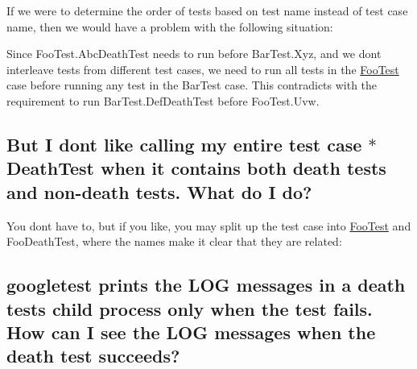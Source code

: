 If we were to determine the order of tests based on test name instead of test case name, then we would have a problem with the following situation\+:


\begin{DoxyCode}{0}
\DoxyCodeLine{}
\end{DoxyCode}


Since {\ttfamily Foo\+Test.\+Abc\+Death\+Test} needs to run before {\ttfamily Bar\+Test.\+Xyz}, and we don\textquotesingle{}t interleave tests from different test cases, we need to run all tests in the {\ttfamily \mbox{\hyperlink{classFooTest}{Foo\+Test}}} case before running any test in the {\ttfamily Bar\+Test} case. This contradicts with the requirement to run {\ttfamily Bar\+Test.\+Def\+Death\+Test} before {\ttfamily Foo\+Test.\+Uvw}.

\subsection*{But I don\textquotesingle{}t like calling my entire test case $\ast$\+Death\+Test when it contains both death tests and non-\/death tests. What do I do?}

You don\textquotesingle{}t have to, but if you like, you may split up the test case into {\ttfamily \mbox{\hyperlink{classFooTest}{Foo\+Test}}} and {\ttfamily Foo\+Death\+Test}, where the names make it clear that they are related\+:


\begin{DoxyCode}{0}
\DoxyCodeLine{}
\DoxyCodeLine{}
\DoxyCodeLine{}
\end{DoxyCode}


\subsection*{googletest prints the L\+OG messages in a death test\textquotesingle{}s child process only when the test fails. How can I see the L\+OG messages when the death test succeeds?}

